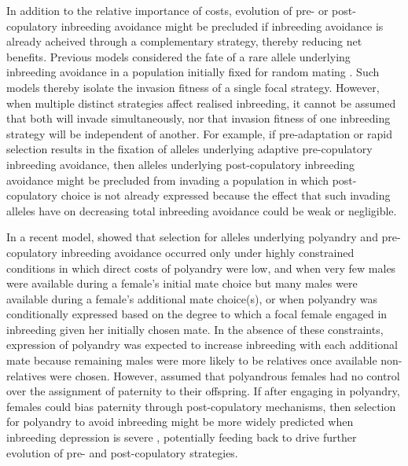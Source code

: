 \documentclass[10pt,letterpaper]{article}
\begin{document}
In addition to the relative importance of costs, evolution of pre- or post-copulatory inbreeding avoidance might be precluded if inbreeding avoidance is already acheived through a complementary strategy, thereby reducing net benefits. Previous models considered the fate of a rare allele underlying inbreeding avoidance in a population initially fixed for random mating \cite[e.g.,][; Duthie and Reid \textit{In press}]{Parker1979, Parker2006, Duthie}. Such models thereby isolate the invasion fitness of a single focal strategy. However, when multiple distinct strategies affect realised inbreeding, it cannot be assumed that both will invade simultaneously, nor that invasion fitness of one inbreeding strategy will be independent of another. For example, if pre-adaptation or rapid selection results in the fixation of alleles underlying adaptive pre-copulatory inbreeding avoidance, then alleles underlying post-copulatory inbreeding avoidance might be precluded from invading a population in which post-copulatory choice is not already expressed because the effect that such invading alleles have on decreasing total inbreeding avoidance could be weak or negligible. 

In a recent model, \cite{Duthie} showed that selection for alleles underlying polyandry and pre-copulatory inbreeding avoidance occurred only under highly constrained conditions in which direct costs of polyandry were low, and when very few males were available during a female's initial mate choice but many males were available during a female's additional mate choice(s), or when polyandry was conditionally expressed based on the degree to which a focal female engaged in inbreeding given her initially chosen mate. In the absence of these constraints, expression of polyandry was expected to increase inbreeding with each additional mate because remaining males were more likely to be relatives once available non-relatives were chosen. However, \cite{Duthie} assumed that polyandrous females had no control over the assignment of paternity to their offspring. If after engaging in polyandry, females could bias paternity through post-copulatory mechanisms, then selection for polyandry to avoid inbreeding might be more widely predicted when inbreeding depression is severe \cite[][]{Zeh1997}, potentially feeding back to drive further evolution of pre- and post-copulatory strategies.
\end{document}
